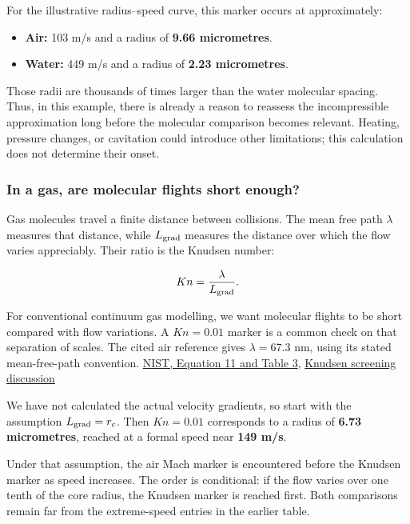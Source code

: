 \documentclass[
  english,
  11pt,
]{article}
\providecommand{\tightlist}{%
  \setlength{\itemsep}{0pt}\setlength{\parskip}{0pt}}
\begin{document}
For the illustrative radius--speed curve, this marker occurs at
approximately:

\begin{itemize}
\tightlist
\item
  \textbf{Air:} 103 m/s and a radius of \textbf{9.66 micrometres}.
\item
  \textbf{Water:} 449 m/s and a radius of \textbf{2.23 micrometres}.
\end{itemize}

Those radii are thousands of times larger than the water molecular
spacing. Thus, in this example, there is already a reason to reassess
the incompressible approximation long before the molecular comparison
becomes relevant. Heating, pressure changes, or cavitation could
introduce other limitations; this calculation does not determine their
onset.

\subsubsection{In a gas, are molecular flights short
enough?}\label{in-a-gas-are-molecular-flights-short-enough}

Gas molecules travel a finite distance between collisions. The mean free
path \(\lambda\) measures that distance, while \(L_{\rm grad}\) measures
the distance over which the flow varies appreciably. Their ratio is the
Knudsen number:

\[
Kn=\frac{\lambda}{L_{\rm grad}}.
\]

For conventional continuum gas modelling, we want molecular flights to
be short compared with flow variations. A \(Kn=0.01\) marker is a common
check on that separation of scales. The cited air reference gives
\(\lambda=67.3\) nm, using its stated mean-free-path convention.
\href{https://nvlpubs.nist.gov/nistpubs/jres/110/1/j110-1kim.pdf}{NIST,
Equation 11 and Table 3},
\href{https://ntrs.nasa.gov/api/citations/20000004526/downloads/20000004526.pdf}{Knudsen
screening discussion}

We have not calculated the actual velocity gradients, so start with the
assumption \(L_{\rm grad}=r_c\). Then \(Kn=0.01\) corresponds to a
radius of \textbf{6.73 micrometres}, reached at a formal speed near
\textbf{149 m/s}.

Under that assumption, the air Mach marker is encountered before the
Knudsen marker as speed increases. The order is conditional: if the flow
varies over one tenth of the core radius, the Knudsen marker is reached
first. Both comparisons remain far from the extreme-speed entries in the
earlier table.
\end{document}
